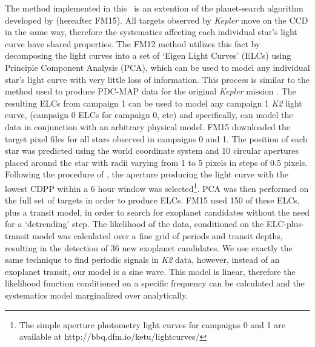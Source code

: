 \documentclass[useAMS, usenatbib, preprint, 12pt]{aastex}
\begin{document}
The method implemented in this \article\ is an extention of the planet-search
algorithm developed by \citet{Foreman-Mackey2015} (hereafter FM15).
All targets observed by {\it Kepler} move on the CCD in the same way,
therefore the systematics affecting each individual star's light curve have
shared properties.
The FM12 method utilizes this fact by decomposing the light curves into a set
of `Eigen Light Curves' (ELCs) using Principle Component Analysis (PCA), which
can be used to model any individual star's light curve with very little loss
of information.
This process is similar to the method used to produce PDC-MAP data for the
original {\it Kepler} mission \citep[][]{Stumpe2012, Smith2012}.
The resulting ELCs from campaign 1 can be used to model any campaign 1 {\it
K2} light curve, (campaign 0 ELCs for campaign 0, etc) and specifically, can
model the data in conjunction with an arbitrary physical model.
FM15 downloaded the target pixel files for all stars observed in campaigns 0
and 1.
The position of each star was predicted using the world coordinate system and
10 circular apertures placed around the star with radii varying from 1 to
5 pixels in steps of 0.5 pixels.
Following the procedure of \citet{Vanderburg2014}, the aperture producing the
light curve with the lowest CDPP within a 6 hour window
\citep{Christiansen2012} was selected\footnote{The simple aperture photometry
light curves for campaigns 0 and 1 are available at
http://bbq.dfm.io/ketu/lightcurves/}.
PCA was then performed on the full set of targets in order to produce ELCs.
FM15 used 150 of these ELCs, plus a transit model, in order to
search for exoplanet candidates without the need for a `detrending' step.
The likelihood of the data, conditioned on the ELC-plus-transit
model was calculated over a fine grid of periods and transit depths, resulting
in the detection of 36 new exoplanet candidates.
We use exactly the same technique to find periodic signals in {\it K2} data,
however, instead of an exoplanet transit, our model is a sine wave.
This model is linear, therefore the likelihood function conditioned on
a specific frequency can be calculated and the systematics model marginalized
over analytically.
\end{document}
